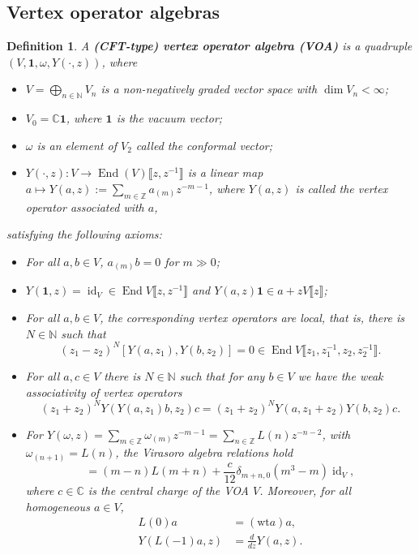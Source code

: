 \documentclass[12pt,a4paper,reqno]{amsart}
\numberwithin{equation}{section}
\newtheorem{definition}[theorem]{Definition}
\theoremstyle{definition}
\newcommand{\End}{\operatorname{End}}
\newcommand{\id}{\operatorname{id}}
\newcommand{\C}{\mathbb{C}}
\newcommand{\N}{\mathbb{N}}
\newcommand{\Z}{\mathbb{Z}}
\newcommand{\lb}{\llbracket}
\newcommand{\rb}{\rrbracket}
\def\vac{\mathbf{1}}
\def\om{\omega}
\def\wt{\mathrm{wt}}
\begin{document}
\subsection{Vertex operator algebras}

\begin{definition}
    A \textbf{(CFT-type) vertex operator algebra (VOA)} is a quadruple $(V,\vac,\omega,Y(\cdot, z))$, where
    \begin{itemize}
        \item $V = \bigoplus_{n\in \N} V_n$ is a non-negatively graded vector space with $\dim V_n < \infty$;
        \item $ V_0=\C\vac$, where $\vac$ is the vacuum vector;
        \item $\omega$ is an element of $V_2$ called the conformal vector;
        \item $Y(\cdot, z): V \rightarrow \End(V)\lb z, z^{-1} \rb $ is a linear map $a\mapsto Y(a,z) := \sum_{m \in \Z} a_{(m)}z^{-m-1}$, where $Y(a,z)$ is called the vertex operator associated with $a$,
    \end{itemize}
    satisfying the following axioms:
    \begin{itemize}
        \item For all $a,b\in V$, $a_{(m)}b=0$ for $m\gg0$;
        \item $Y(\vac,z)=\id_V \in \End V \lb z,z^{-1} \rb$ and $Y(a,z)\vac \in a + zV\lb z \rb$;
        \item For all $a,b \in V$, the corresponding vertex operators are local, that is, there is $N \in \N$ such that
        \begin{equation}
            (z_1-z_2)^N[Y(a,z_1), Y(b,z_2)] = 0 \in \End V \lb z_1,z_1^{-1}, z_2, z_2^{-1} \rb.
        \end{equation}
        \item For all $a,c\in V$ there is $N\in\N$ such that for any $b\in V$ we have the weak associativity of vertex operators
        \begin{equation}
            (z_1+z_2)^N Y(Y(a,z_1)b,z_2)c = (z_1+z_2)^N Y(a,z_1+z_2)Y(b,z_2)c.
        \end{equation}
        \item For $Y(\omega,z) = \sum_{m \in \Z} \omega_{(m)}z^{-m-1}=\sum_{n \in \Z} L(n)z^{-n-2}$, with $\om_{(n+1)}=L(n)$, the Virasoro algebra relations hold
        \begin{equation}
            [L(m),L(n)] = (m-n) L(m+n) + \frac{c}{12} \delta_{m+n,0} (m^3-m) \id_V,
        \end{equation}
        where $c\in \C$ is the central charge of the VOA $V$. Moreover, for all homogeneous $a\in V$,
        \begin{equation}
            \begin{split}
              L(0) a &= (\wt a)a,\\
                Y(L(-1)a,z) &= \frac{d}{dz} Y(a,z).
            \end{split}
        \end{equation}
    \end{itemize}
\end{definition}
\end{document}
